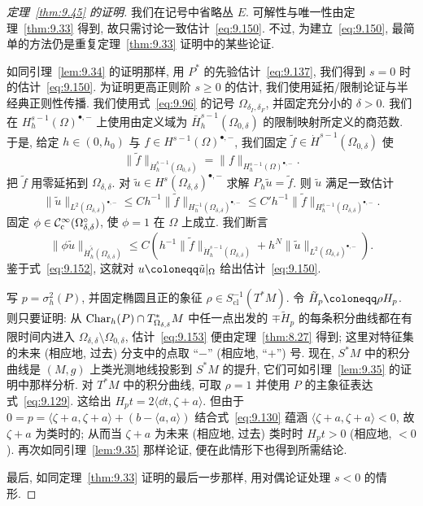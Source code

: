 \begin{proof}[定理~\ref{thm:9.45} 的证明]
我们在记号中省略丛 $E$. 可解性与唯一性由定理~\ref{thm:9.33} 得到, 故只需讨论一致估计~\eqref{eq:9.150}. 不过, 为建立~\eqref{eq:9.150}, 最简单的方法仍是重复定理~\ref{thm:9.33} 证明中的某些论证.

如同引理~\ref{lem:9.34} 的证明那样, 用 $P^*$ 的先验估计~\eqref{eq:9.137}, 我们得到 $s = 0$ 时的估计~\eqref{eq:9.150}. 为证明更高正则阶 $s \ge 0$ 的估计, 我们使用延拓/限制论证与半经典正则性传播. 我们使用式~\eqref{eq:9.96} 的记号 $\Omega_{\delta_I, \delta_F}$, 并固定充分小的 $\delta > 0$. 我们在 $H_h^{s-1}(\Omega)^{\bullet,-}$ 上使用由定义域为 $\bar{H}_h^{s-1}(\Omega_{0,\delta})$ 的限制映射所定义的商范数. 于是, 给定 $h \in (0, h_0)$ 与 $f \in H^{s-1}(\Omega)^{\bullet,-}$, 我们固定 $\tilde f \in \dot{H}^{s-1}(\Omega_{0,\delta})$ 使
\begin{equation}\label{eq:9.151}
    \|\tilde f\|_{\dot{H}_h^{s-1}(\Omega_{0,\delta})} = \|f\|_{H_h^{s-1}(\Omega)^{\bullet,-}}.
\end{equation}
把 $\tilde f$ 用零延拓到 $\Omega_{\delta,\delta}$. 对 $\tilde u \in H^s(\Omega_{\delta,\delta})^{\bullet,-}$ 求解 $P_h \tilde u = \tilde f$. 则 $\tilde u$ 满足一致估计
\begin{equation}\label{eq:9.152}
    \|\tilde u\|_{L^2(\Omega_{\delta,\delta})^{\bullet,-}} \le C h^{-1} \|\tilde f\|_{H_h^{-1}(\Omega_{\delta,\delta})^{\bullet,-}} \le C' h^{-1} \|\tilde f\|_{H_h^{s-1}(\Omega_{\delta,\delta})^{\bullet,-}}.
\end{equation}
固定 $\phi \in \mathcal{C}_{\mathrm{c}}^\infty(\Omega_{\delta,\delta}^\circ)$, 使 $\phi = 1$ 在 $\Omega$ 上成立. 我们断言
\begin{equation}\label{eq:9.153}
    \|\phi \tilde u\|_{\dot{H}_h^{\tilde s}(\Omega_{\delta,\delta})} \le C \left( h^{-1} \|\tilde f\|_{\dot{H}_h^{s-1}(\Omega_{\delta,\delta})} + h^N \|\tilde u\|_{L^2(\Omega_{\delta,\delta})^{\bullet,-}} \right).
\end{equation}
鉴于式~\eqref{eq:9.152}, 这就对 $u \defeq \tilde u|_\Omega$ 给出估计~\eqref{eq:9.150}.

写 $p = \sigma_h^2(P)$, 并固定椭圆且正的象征 $\rho \in S_{\mathrm{cl}}^{-1}(T^* M)$. 令 $\tilde H_p \defeq \rho H_p$. 则只要证明: 从 $\operatorname{Char}_h(P) \cap T_{\Omega_{\delta,\delta}}^* M$ 中任一点出发的 $\mp \tilde H_p$ 的每条积分曲线都在有限时间内进入 $\Omega_{\delta,\delta} \setminus \Omega_{0,\delta}$, 估计~\eqref{eq:9.153} 便由定理~\ref{thm:8.27} 得到; 这里对特征集的未来 (相应地, 过去) 分支中的点取 ``$-$'' (相应地, ``$+$'') 号. 现在, $S^* M$ 中的积分曲线是 $(M, g)$ 上类光测地线投影到 $S^* M$ 的提升, 它们可如引理~\ref{lem:9.35} 的证明中那样分析. 对 $T^* M$ 中的积分曲线, 可取 $\rho = 1$ 并使用 $P$ 的主象征表达式~\eqref{eq:9.129}. 这给出 $H_p t = 2\langle \dd t, \zeta + a \rangle$. 但由于 $0 = p = \langle \zeta + a, \zeta + a \rangle + (b - \langle a, a \rangle)$ 结合式~\eqref{eq:9.130} 蕴涵 $\langle \zeta + a, \zeta + a \rangle < 0$, 故 $\zeta + a$ 为类时的; 从而当 $\zeta + a$ 为未来 (相应地, 过去) 类时时 $H_p t > 0$ (相应地, $< 0$). 再次如同引理~\ref{lem:9.35} 那样论证, 便在此情形下也得到所需结论.

最后, 如同定理~\ref{thm:9.33} 证明的最后一步那样, 用对偶论证处理 $s < 0$ 的情形.
\end{proof}

